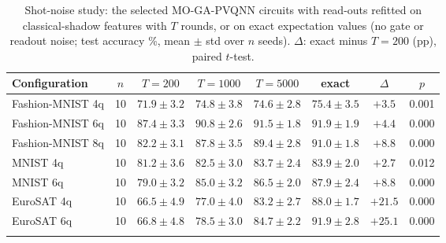 \begin{table}[t]
\caption{Shot-noise study: the selected MO-GA-PVQNN circuits with read-outs refitted on classical-shadow features with $T$ rounds, or on exact expectation values (no gate or readout noise; test accuracy \%, mean $\pm$ std over $n$ seeds). $\Delta$: exact minus $T=200$ (pp), paired $t$-test.}\label{tab:shots}
\footnotesize
\begin{tabular}{@{}lccccccc@{}}
\toprule
Configuration & $n$ & $T=200$ & $T=1000$ & $T=5000$ & exact & $\Delta$ & $p$ \\
\midrule
Fashion-MNIST 4q & 10 & $71.9\pm3.2$ & $74.8\pm3.8$ & $74.6\pm2.8$ & $75.4\pm3.5$ & $+3.5$ & 0.001 \\
Fashion-MNIST 6q & 10 & $87.4\pm3.3$ & $90.8\pm2.6$ & $91.5\pm1.8$ & $91.9\pm1.9$ & $+4.4$ & 0.000 \\
Fashion-MNIST 8q & 10 & $82.2\pm3.1$ & $87.8\pm3.5$ & $89.4\pm2.8$ & $91.0\pm1.8$ & $+8.8$ & 0.000 \\
MNIST 4q & 10 & $81.2\pm3.6$ & $82.5\pm3.0$ & $83.7\pm2.4$ & $83.9\pm2.0$ & $+2.7$ & 0.012 \\
MNIST 6q & 10 & $79.0\pm3.2$ & $85.0\pm3.2$ & $86.5\pm2.0$ & $87.9\pm2.4$ & $+8.8$ & 0.000 \\
EuroSAT 4q & 10 & $66.5\pm4.9$ & $77.0\pm4.0$ & $83.2\pm2.7$ & $88.0\pm1.7$ & $+21.5$ & 0.000 \\
EuroSAT 6q & 10 & $66.8\pm4.8$ & $78.5\pm3.0$ & $84.7\pm2.2$ & $91.9\pm2.8$ & $+25.1$ & 0.000 \\
\botrule
\end{tabular}
\end{table}
